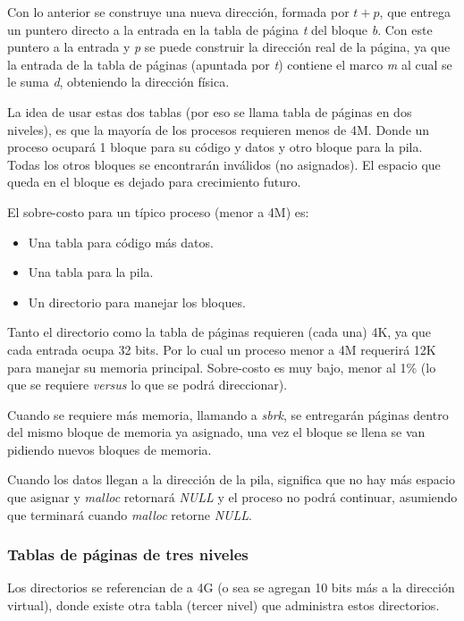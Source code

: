 Con lo anterior se construye una nueva dirección, formada por $t+p$, que entrega
un puntero directo a la entrada en la tabla de página \textit{t} del bloque
\textit{b}. Con este puntero a la entrada y \textit{p} se puede construir la
dirección real de la página, ya que la entrada de la tabla de páginas (apuntada
por \textit{t}) contiene el marco \textit{m} al cual se le suma \textit{d},
obteniendo la dirección física.

La idea de usar estas dos tablas (por eso se llama tabla de páginas en dos
niveles), es que la mayoría de los procesos requieren menos de 4M. Donde un
proceso ocupará 1 bloque para su código y datos y otro bloque para la pila.
Todas los otros bloques se encontrarán inválidos (no asignados). El espacio que
queda en el bloque es dejado para crecimiento futuro.

El sobre-costo para un típico proceso (menor a 4M) es:
\begin{itemize}
	\item Una tabla para código más datos.
	\item Una tabla para la pila.
	\item Un directorio para manejar los bloques.
\end{itemize}

Tanto el directorio como la tabla de páginas requieren (cada una) 4K, ya que
cada entrada ocupa 32 bits. Por lo cual un proceso menor a 4M requerirá 12K para
manejar su memoria principal. Sobre-costo es muy bajo, menor al 1\% (lo que se
requiere \textit{versus} lo que se podrá direccionar).

Cuando se requiere más memoria, llamando a \textit{sbrk}, se entregarán páginas
dentro del mismo bloque de memoria ya asignado, una vez el bloque se llena se
van pidiendo nuevos bloques de memoria.

Cuando los datos llegan a la dirección de la pila, significa que no hay más
espacio que asignar y \textit{malloc} retornará \textit{NULL} y el proceso no
podrá continuar, asumiendo que terminará cuando \textit{malloc} retorne
\textit{NULL}.

\subsubsection{Tablas de páginas de tres niveles}

Los directorios se referencian de a 4G (o sea se agregan 10 bits más a la
dirección virtual), donde existe otra tabla (tercer nivel) que administra estos
directorios.

